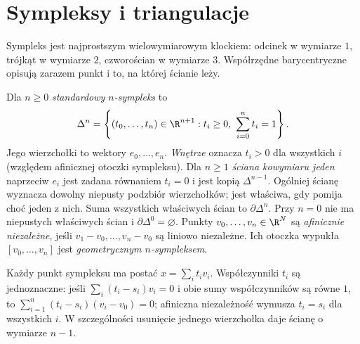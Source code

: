 \section{Sympleksy i triangulacje}
\label{sec:sympleksy}

Sympleks jest najprostszym wielowymiarowym
klockiem: odcinek w wymiarze $1$, trójkąt
w wymiarze $2$, czworościan w wymiarze $3$.
Współrzędne barycentryczne opisują
zarazem punkt i to, na której ścianie leży.

\begin{definicja}
\label{def:sympleks-standardowy}
Dla $n\geq0$ \emph{standardowy $n$-sympleks}
to
\[
 \Delta^n=
 \left\{(t_0,\ldots,t_n)\in\R^{n+1}:
 t_i\geq0,\ \sum_{i=0}^{n}t_i=1\right\}.
\]
Jego wierzchołki to wektory $e_0,\ldots,e_n$.
\emph{Wnętrze} oznacza $t_i>0$ dla wszystkich $i$
(względem afinicznej otoczki sympleksu).
Dla $n\geq1$ \emph{ściana kowymiaru jeden} naprzeciw $e_i$
jest zadana równaniem $t_i=0$ i jest kopią $\Delta^{n-1}$.
Ogólniej ścianę wyznacza dowolny niepusty podzbiór wierzchołków;
jest właściwa, gdy pomija choć jeden z nich.
Suma wszystkich właściwych ścian to $\partial\Delta^n$.
Przy $n=0$ nie ma niepustych właściwych ścian i $\partial\Delta^0=\varnothing$.
Punkty $v_0,\ldots,v_n\in\R^N$
są \emph{afinicznie niezależne}, jeśli
$v_1-v_0,\ldots,v_n-v_0$ są liniowo
niezależne. Ich otoczka wypukła
$[v_0,\ldots,v_n]$ jest
\emph{geometrycznym $n$-sympleksem}.
\end{definicja}

Każdy punkt sympleksu ma postać
$x=\sum_i t_iv_i$. Współczynniki
$t_i$ są jednoznaczne: jeśli
$\sum_i(t_i-s_i)v_i=0$ i obie sumy
współczynników są równe $1$, to
$\sum_{i=1}^n(t_i-s_i)(v_i-v_0)=0$;
afiniczna niezależność wymusza
$t_i=s_i$ dla wszystkich $i$.
W szczególności usunięcie jednego
wierzchołka daje ścianę
o wymiarze $n-1$.

